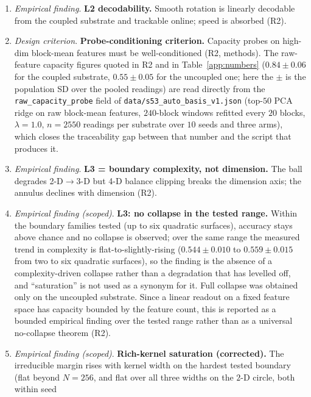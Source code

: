 \documentclass[preprint,12pt]{elsarticle}
\begin{document}
\begin{enumerate}[label=\arabic*.]
demonstrates is the uniform sign flip $w\to-w$, a single scalar sign change
applied to all weight coordinates together, which is not a per-dimension
gain. The criterion is reported as a design motivation supported by that
observation, not as a proved necessity.
\item \emph{Empirical finding}. \textbf{L2 decodability.} Smooth rotation is linearly decodable from
the coupled substrate and trackable online; speed is absorbed (R2).
\item \emph{Design criterion}. \textbf{Probe-conditioning criterion.} Capacity probes on high-dim
block-mean features must be well-conditioned (R2, methods). The raw-feature
capacity figures quoted in R2 and in Table~\ref{app:numbers}
($0.84\pm0.06$ for the coupled substrate, $0.55\pm0.05$ for the uncoupled one; here the $\pm$ is the population SD over the pooled readings)
are read directly from the \texttt{raw\_capacity\_probe} field of
\texttt{data/s53\_auto\_basis\_v1.json} (top-$50$ PCA ridge on raw block-mean
features, $240$-block windows refitted every $20$ blocks, $\lambda=1.0$,
$n=2550$ readings per substrate over $10$ seeds and three arms), which closes
the traceability gap between that number and the script that produces it.
\item \emph{Empirical finding}. \textbf{L3 = boundary complexity, not dimension.} The ball degrades
2-D$\to$3-D but 4-D balance clipping breaks the dimension axis; the annulus
declines with dimension (R2).
\item \emph{Empirical finding (scoped)}. \textbf{L3: no collapse in the tested range.}
Within the boundary families tested (up to six quadratic surfaces),
accuracy stays above chance and no collapse is observed; over the same range
the measured trend in complexity is flat-to-slightly-rising ($0.544\pm0.010$
to $0.559\pm0.015$ from two to six quadratic surfaces), so the finding is the
absence of a complexity-driven collapse rather than a degradation that has
levelled off, and ``saturation'' is not used as a synonym for it. Full collapse
was obtained only on the uncoupled substrate. Since a linear readout on a
fixed feature space has capacity bounded by the feature count, this is
reported as a bounded empirical finding over the tested range rather than as
a universal no-collapse theorem (R2).
\item \emph{Empirical finding (scoped)}. \textbf{Rich-kernel saturation (corrected).} The irreducible margin
rises with kernel width on the hardest tested boundary (flat beyond
$N=256$, and flat over all three widths on the $2$-D circle, both within seed

\end{enumerate}
\end{document}
